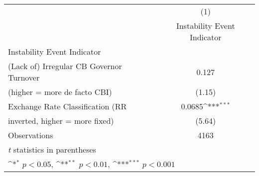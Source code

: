 {
\def\sym#1{\ifmmode^{#1}\else\(^{#1}\)\fi}
\begin{tabular}{l*{1}{c}}
\toprule
                                        &\multicolumn{1}{c}{(1)}\\
                                        &\multicolumn{1}{c}{Instability Event Indicator}\\
\midrule
Instability Event Indicator             &              \\
(Lack of) Irregular CB Governor Turnover&0.127         \\
(higher = more de facto CBI)            &(1.15)         \\
\addlinespace
Exchange Rate Classification (RR        &0.0685\sym{***}\\
inverted, higher = more fixed)          &(5.64)         \\
\midrule
Observations                            & 4163         \\
\bottomrule
\multicolumn{2}{l}{\footnotesize \textit{t} statistics in parentheses}\\
\multicolumn{2}{l}{\footnotesize \sym{*} \(p<0.05\), \sym{**} \(p<0.01\), \sym{***} \(p<0.001\)}\\
\end{tabular}
}

